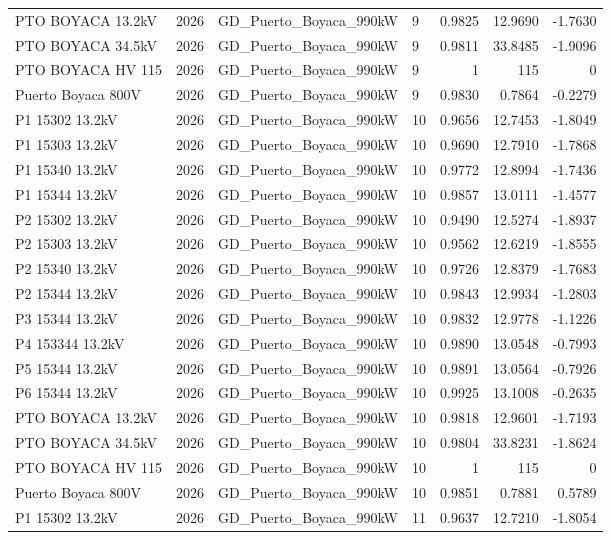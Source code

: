 \documentclass[11pt,a4paper]{article}
\begin{document}
\begin{longtable}{llllrrr}
PTO BOYACA 13.2kV & 2026 & GD\_Puerto\_Boyaca\_990kW & 9 & 0.9825 & 12.9690 & -1.7630 \\
PTO BOYACA 34.5kV & 2026 & GD\_Puerto\_Boyaca\_990kW & 9 & 0.9811 & 33.8485 & -1.9096 \\
PTO BOYACA HV 115 & 2026 & GD\_Puerto\_Boyaca\_990kW & 9 & 1 & 115 & 0 \\
Puerto Boyaca 800V & 2026 & GD\_Puerto\_Boyaca\_990kW & 9 & 0.9830 & 0.7864 & -0.2279 \\
P1 15302 13.2kV & 2026 & GD\_Puerto\_Boyaca\_990kW & 10 & 0.9656 & 12.7453 & -1.8049 \\
P1 15303 13.2kV & 2026 & GD\_Puerto\_Boyaca\_990kW & 10 & 0.9690 & 12.7910 & -1.7868 \\
P1 15340 13.2kV & 2026 & GD\_Puerto\_Boyaca\_990kW & 10 & 0.9772 & 12.8994 & -1.7436 \\
P1 15344 13.2kV & 2026 & GD\_Puerto\_Boyaca\_990kW & 10 & 0.9857 & 13.0111 & -1.4577 \\
P2 15302 13.2kV & 2026 & GD\_Puerto\_Boyaca\_990kW & 10 & 0.9490 & 12.5274 & -1.8937 \\
P2 15303 13.2kV & 2026 & GD\_Puerto\_Boyaca\_990kW & 10 & 0.9562 & 12.6219 & -1.8555 \\
P2 15340 13.2kV & 2026 & GD\_Puerto\_Boyaca\_990kW & 10 & 0.9726 & 12.8379 & -1.7683 \\
P2 15344 13.2kV & 2026 & GD\_Puerto\_Boyaca\_990kW & 10 & 0.9843 & 12.9934 & -1.2803 \\
P3 15344 13.2kV & 2026 & GD\_Puerto\_Boyaca\_990kW & 10 & 0.9832 & 12.9778 & -1.1226 \\
P4 153344 13.2kV & 2026 & GD\_Puerto\_Boyaca\_990kW & 10 & 0.9890 & 13.0548 & -0.7993 \\
P5 15344 13.2kV & 2026 & GD\_Puerto\_Boyaca\_990kW & 10 & 0.9891 & 13.0564 & -0.7926 \\
P6 15344 13.2kV & 2026 & GD\_Puerto\_Boyaca\_990kW & 10 & 0.9925 & 13.1008 & -0.2635 \\
PTO BOYACA 13.2kV & 2026 & GD\_Puerto\_Boyaca\_990kW & 10 & 0.9818 & 12.9601 & -1.7193 \\
PTO BOYACA 34.5kV & 2026 & GD\_Puerto\_Boyaca\_990kW & 10 & 0.9804 & 33.8231 & -1.8624 \\
PTO BOYACA HV 115 & 2026 & GD\_Puerto\_Boyaca\_990kW & 10 & 1 & 115 & 0 \\
Puerto Boyaca 800V & 2026 & GD\_Puerto\_Boyaca\_990kW & 10 & 0.9851 & 0.7881 & 0.5789 \\
P1 15302 13.2kV & 2026 & GD\_Puerto\_Boyaca\_990kW & 11 & 0.9637 & 12.7210 & -1.8054 \\

\end{longtable}
\end{document}
